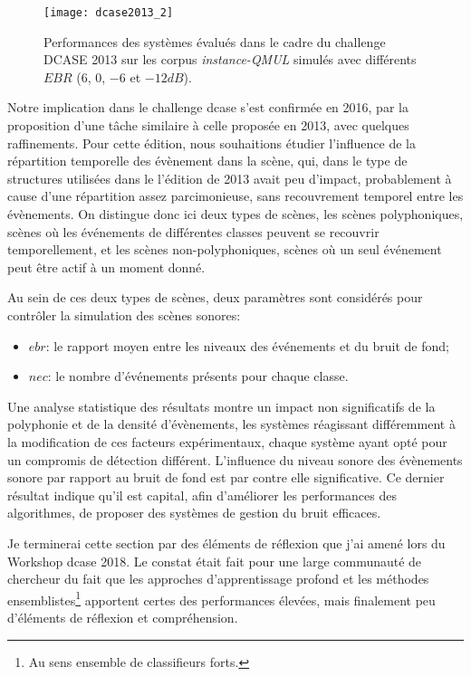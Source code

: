 \begin{figure}[t]
\begin{center}
\texttt{[image: dcase2013\_2]}
\caption{Performances des systèmes évalués dans le cadre du challenge DCASE 2013 sur les corpus \emph{instance-QMUL} simulés avec différents $EBR$ ($6$, $0$, $-6$ et $-12dB$).}
\label{fig:ebr}
\end{center}
\end{figure}

Notre implication dans le challenge dcase s'est confirmée en 2016\cite{mesa}, par la proposition d'une tâche similaire à celle proposée en 2013, avec quelques raffinements. Pour cette édition, nous souhaitions étudier l'influence de la répartition temporelle des évènement dans la scène, qui, dans le type de structures utilisées dans le l'édition de 2013 avait peu d'impact, probablement à cause d'une répartition assez parcimonieuse, sans recouvrement temporel entre les évènements. On distingue donc ici deux types de scènes, les scènes polyphoniques, scènes où les événements de différentes classes peuvent se recouvrir temporellement, et les scènes non-polyphoniques, scènes où un seul événement peut être actif à un moment donné.

Au sein de ces deux types de scènes, deux paramètres sont considérés pour contrôler la simulation des scènes sonores:
\begin{itemize}
\item $ebr$: le rapport moyen entre les niveaux des événements et du bruit de fond;
\item $nec$: le nombre d'événements présents pour chaque classe.
\end{itemize}

Une analyse statistique des résultats\cite{lafayhal-01635414} montre un impact non significatifs de la polyphonie et de la densité d'évènements, les systèmes réagissant différemment à la modification de ces facteurs expérimentaux, chaque système ayant opté pour un compromis de détection différent. L'influence du niveau sonore des évènements sonore par rapport au bruit de fond est par contre elle significative. Ce dernier résultat indique qu'il est capital, afin d'améliorer les performances des algorithmes, de proposer des systèmes de gestion du bruit efficaces.

Je terminerai cette section par des éléments de réflexion que j'ai amené lors du Workshop dcase 2018. Le constat était fait pour une large communauté de chercheur du fait que les approches d'apprentissage profond et les méthodes ensemblistes\footnote{Au sens ensemble de classifieurs forts.} apportent certes des performances élevées, mais finalement peu d'éléments de réflexion et compréhension.

